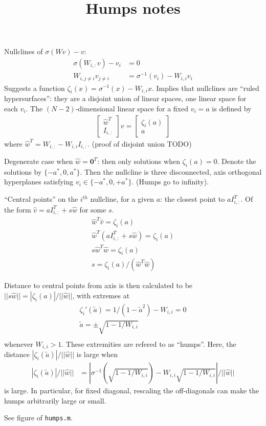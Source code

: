 \documentclass[pdftex,12pt,letterpaper]{article}
\begin{document}
\title{Humps notes}
\date{}
\maketitle

Nullclines of $\sigma(Wv)-v$:
\begin{align}
\sigma(W_{i,:}v) - v_i &= 0 \\
W_{i,j\ne i}v_{j\ne i} &= \sigma^{-1}(v_i) - W_{i,i}v_i
\end{align}
Suggests a function $\zeta_i(x) = \sigma^{-1}(x) - W_{i,i}x$.  Implies that nullclines are ``ruled hypersurfaces'': they are a disjoint union of linear spaces, one linear space for each $v_i$.  The $(N-2)$-dimensional linear space for a fixed $v_i = a$ is defined by
\begin{align}
\left[\begin{array}{c} \hat{w}^T \\ I_{i,:}\end{array}\right]v = \left[\begin{array}{c} \zeta_i(a) \\ a\end{array}\right]
\end{align}
where $\hat{w}^T = W_{i,:} - W_{i,i}I_{i,:}$. (proof of disjoint union TODO)

Degenerate case when $\hat{w} = \mathbf{0}^T$:  then only solutions when $\zeta_i(a) = 0$.  Denote the solutions by $\{-a^*, 0, a^*\}$.  Then the nullcline is three disconnected, axis orthogonal hyperplanes satisfying $v_i \in \{-a^*, 0, +a^*\}$. (Humps go to infinity).

``Central points'' on the $i^{th}$ nullcline, for a given $a$: the closest point to $aI_{i,:}^T$.  Of the form $\hat{v} = aI_{i,:}^T + s\hat{w}$ for some $s$.
\begin{align}
\hat{w}^T\hat{v} = \zeta_i(a) \\
\hat{w}^T(aI_{i,:}^T + s\hat{w}) = \zeta_i(a) \\
s\hat{w}^T\hat{w} = \zeta_i(a) \\
s = \zeta_i(a) / (\hat{w}^T\hat{w})
\end{align}

Distance to central points from axis is then calculated to be $|| s\hat{w} || = |\zeta_i(a)| / ||\hat{w}||$, with extremes at
\begin{align}
\zeta_i'(\tilde{a}) = 1 / (1 - \tilde{a}^2) - W_{i,i} = 0 \\
\tilde{a} = \pm \sqrt{1 - 1/W_{i,i}} \\
\end{align}
whenever $W_{i,i} > 1$.  These extremities are refered to as ``humps''.  Here, the distance $|\zeta_i(\tilde{a})| / ||\hat{w}||$ is large when
\begin{align}
|\zeta_i(\tilde{a})|/||\hat{w}||
&= |\sigma^{-1}(\sqrt{1 - 1/W_{i,i}}) - W_{i,i}\sqrt{1 - 1/W_{i,i}}|/||\hat{w}||
\end{align}
is large.  In particular, for fixed diagonal, rescaling the off-diagonals can make the humps arbitrarily large or small.

See figure of \texttt{humps.m}.
\end{document}
